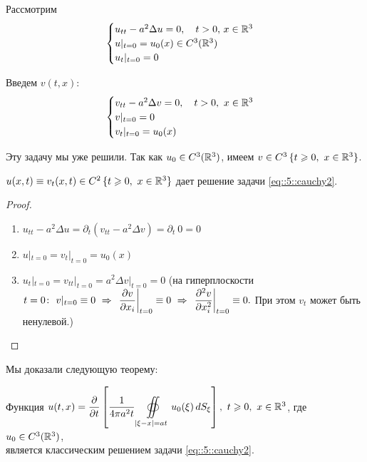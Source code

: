 \documentclass[../main.tex]{subfiles}
\begin{document}
Рассмотрим
\begin{equation}
\begin{cases}
  u_{tt}-a^2\Delta u=0,\quad t>0,\, x\in \mathbb{R}^3\\
  u|_{t=0}=u_0(x) \in C^3(\mathbb{R}^3)\\
  u_t|_{t=0}=0
\end{cases}
\label{eq::5::cauchy2}
\end{equation}

Введем $v(t,x)$:
\[
\begin{cases}
  v_{tt} - a^2 \Delta v=0,  \quad t>0,\ x\in \mathbb{R}^3 \\
  v  |_{t=0} = 0 \\ 
  v_t|_{t=0} = u_0(x)
\end{cases}
\]

Эту задачу мы уже решили. Так как $u_0\in C^3(\mathbb{R}^3)$, 
имеем $v\in C^3\, \{t\geqslant 0,\  x\in\mathbb{R}^3\}$.

\begin{statement}
$u(x,t) \equiv v_t(x, t) \in C^2\, \{t\geqslant 0,\  x\in\mathbb{R}^3 \}$ 
дает решение задачи \eqref{eq::5::cauchy2}.
\end{statement}

\begin{proof}$\ $
\begin{enumerate}

\item  $u_{tt} - a^2 \Delta u 
= \partial_t (v_{tt} - a^2 \Delta v) 
= \partial_t\: 0 
= 0$

\item $ u|_{t=0} = v_t|_{t=0} = u_0(x) $

\item $u_t|_{t=0} = v_{tt}|_{t=0} = a^2 \Delta v |_{t=0} = 0$ 
%
(на гиперплоскости  $t=0  \colon\ 
                 v|_{t=0} \equiv 0\ \Rightarrow\ 
 \while{\pd{v}{x_i}}{t=0} \equiv 0\ \Rightarrow\ 
\while{\pdd{v}{x_i}}{t=0} \equiv 0. $ 
\; При этом $v_t$ может быть ненулевой.)

\end{enumerate}
\end{proof}

Мы доказали следующую теорему:
\begin{theorem}
Функция $u(t,x) = \pd{}{t}
  \left[
    \dfrac{1}{4\pi a^2t}\displaystyle\oiint\limits_{|\xi-x|=at}  u_0(\xi)\,  dS_{\xi } 
  \right],\ 
t \geq 0,\   x\in\R^3$,  где $u_0 \in C^3(\mathbb{R}^3)$, \\[1em]
является классическим решением задачи \eqref{eq::5::cauchy2}. 
\end{theorem}
\end{document}
